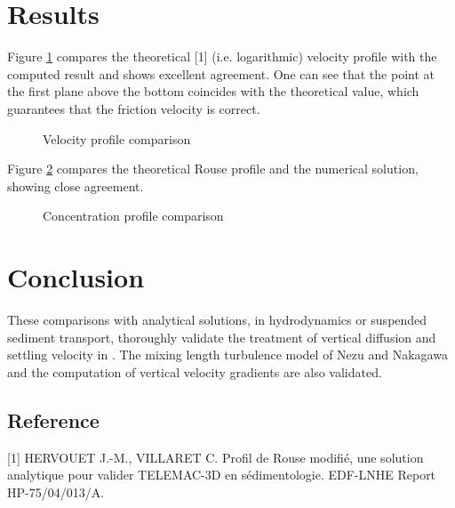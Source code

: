 \section{Results}
%
Figure \ref{velprof} compares the theoretical [1] (i.e. logarithmic)
velocity profile with the computed result and shows excellent agreement.
One can see that the point at the first plane above the bottom coincides
with the theoretical value, which guarantees that the friction velocity
is correct.\\
%
\begin{figure} [h]
\centering
{}
\caption{Velocity profile comparison}\label{velprof}
\end{figure}
%
%
%
Figure \ref{Cprof} compares the theoretical Rouse profile and the
numerical solution, showing close agreement.
%
\begin{figure} [h]
\centering
{}
\caption{Concentration profile comparison}\label{Cprof}
\end{figure}
%
%
\section{Conclusion}
%
These comparisons with analytical solutions, in hydrodynamics or
suspended sediment transport, thoroughly validate the treatment of
vertical diffusion and settling velocity in .
The mixing length turbulence model of Nezu and Nakagawa and the
computation of vertical velocity gradients are also validated.
%
%
%
%
\subsection{Reference}
%
[1] HERVOUET J.-M., VILLARET C. Profil de Rouse modifié, une solution
analytique pour valider TELEMAC-3D en sédimentologie.
EDF-LNHE Report HP-75/04/013/A.
